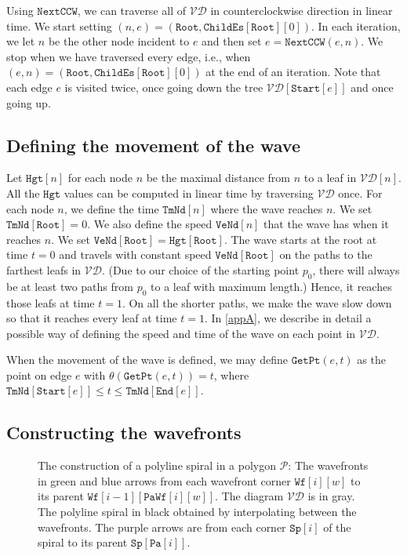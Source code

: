 \documentclass[3p]{elsarticle}
\newcommand{\VD}{\mathcal{VD}}
\newcommand{\PP}{\mathcal{P}}
\newcommand{\childEdges}{\texttt{ChildEs}}
\newcommand{\nodeStart}{\texttt{Start}}
\newcommand{\nodeEnd}{\texttt{End}}
\newcommand{\getNextEdge}{\texttt{NextCCW}}
\newcommand{\ttimeO}{\texttt{TmNd}}
\newcommand{\speedO}{\texttt{VeNd}}
\newcommand{\height}{\texttt{Hgt}}
\newcommand{\getPoint}{\texttt{GetPt}}
\newcommand{\wavefront}{\texttt{Wf}}
\newcommand{\rootNode}{\texttt{Root}}
\newcommand{\spiral}{\texttt{Sp}}
\newcommand{\parent}{\texttt{Pa}}
\newcommand{\parentWavefrontCorner}{\parent\wavefront}
\begin{document}
Using $\getNextEdge$, we can traverse all of $\VD$ in counterclockwise direction in linear time.
We start setting $(n,e)=(\rootNode,\childEdges[\rootNode][0])$.
In each iteration, we let $n$ be the other node incident to $e$ and
then set $e=\getNextEdge(e,n)$.
We stop when we have traversed every edge, i.e., when
$(e,n)=(\rootNode,\childEdges[\rootNode][0])$ at the end of an iteration. Note that each edge $e$
is visited twice, once going down the tree $\VD[\nodeStart[e]]$ and once going up.

\subsection{Defining the movement of the wave}\label{movementOfWave}

Let $\height[n]$ for each node $n$ be the maximal distance from $n$ to a leaf in $\VD[n]$.
All the $\height$ values can be computed in linear time by traversing $\VD$ once.
For each node $n$, we define the time $\ttimeO[n]$ where the wave reaches $n$.
We set $\ttimeO[\rootNode]=0$. We also define the speed $\speedO[n]$ that the wave has when it
reaches $n$. We set $\speedO[\rootNode]=\height[\rootNode]$.
The wave starts at the root at time $t=0$
and travels with constant speed $\speedO[\rootNode]$ on the paths to the farthest leafs in $\VD$.
(Due to our choice of the starting point $p_0$, there will always be at least two paths
from $p_0$ to a leaf with maximum length.)
Hence,
it reaches those leafs at time $t=1$. On all the shorter paths, we make the wave slow down
so that it reaches every leaf at time $t=1$.
In \ref{appA}, we describe in detail a possible way of defining the speed and time of the wave
on each point in $\VD$.

When the movement of the wave is defined,
we may define $\getPoint(e,t)$ as the point on edge $e$ with $\theta(\getPoint(e,t))=t$,
where $\ttimeO[\nodeStart[e]]\leq t\leq \ttimeO[\nodeEnd[e]]$.

\subsection{Constructing the wavefronts}\label{constructingWavefronts}

\begin{figure*}[h]
\centering
{}\quad
{}
\caption{The construction of a polyline spiral in a polygon $\PP$:
 The wavefronts in green and blue arrows from each wavefront corner
$\wavefront[i][w]$
to its parent $\wavefront[i-1][\parentWavefrontCorner[i][w]]$.
The diagram $\VD$ is in gray.
 The polyline spiral in black obtained by interpolating
between the wavefronts. The purple arrows are from each corner $\spiral[i]$
of the spiral to its parent $\spiral[\parent[i]]$.
}
\label{polylineSpiralFig}
\end{figure*}
\end{document}
